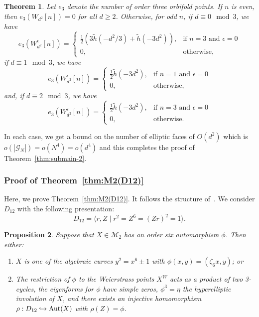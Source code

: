\documentclass[a4paper,11pt]{amsart}
\numberwithin{equation}{section}
\numberwithin{figure}{section}
\numberwithin{table}{section}
\newtheorem{theorem}{Theorem}[section]
\newtheorem{proposition}[theorem]{Proposition}
\DeclareMathOperator{\Aut}{{\rm{Aut}}}
\begin{document}
\begin{theorem}\label{thm:e3}
    Let $e_{3}$ denote the number of order three orbifold points. If $n$ is even, then $e_{3}(W_{d^2}[n]) = 0$ for all $d\geq 2$. Otherwise, for odd $n$, if $d\equiv 0\!\!\mod 3$, we have
    \[e_{3}(W_{d^2}^{\epsilon}[n]) = \left\lbrace\begin{array}{cl}
        \frac{1}{2}(3\tilde{h}(-d^2/3) + \tilde{h}(-3d^2)), & \text{if $n = 3$ and $\epsilon = 0$} \\
        0, & \text{otherwise},
    \end{array}\right.\]
    if $d\equiv 1\!\!\mod 3$, we have
    \[e_{3}(W_{d^2}^{\epsilon}[n]) = \left\lbrace\begin{array}{cl}
        \frac{1}{2}\tilde{h}(-3d^2), & \text{if $n = 1$ and $\epsilon = 0$} \\
        0, & \text{otherwise},
    \end{array}\right.\]
    and, if $d\equiv 2\!\!\mod 3$, we have
    \[e_{3}(W_{d^2}^{\epsilon}[n]) = \left\lbrace\begin{array}{cl}
        \frac{1}{2}\tilde{h}(-3d^2), & \text{if $n = 3$ and $\epsilon = 0$} \\
        0, & \text{otherwise}.
    \end{array}\right.\]
\end{theorem}

In each case, we get a bound on the number of elliptic faces of $O(d^2)$ which is $o(|\mathcal{G}_{N}|) = o(N^{4}) = o(d^{4})$ and this completes the proof of Theorem~\ref{thm:submain-2}.

\subsubsection{Proof of Theorem~\ref{thm:M2(D12)}}

Here, we prove Theorem~\ref{thm:M2(D12)}. It follows the structure of~\cite[\S 2]{Muk}. We consider $D_{12}$ with the following presentation:
\[D_{12} = \langle r, Z\mid r^2 = Z^6 = (Zr)^2 = 1\rangle.\]

\begin{proposition}\label{prop:M2(D12)-1}
    Suppose that $X\in\mathcal{M}_{2}$ has an order six automorphism $\phi$. Then either:
    \begin{enumerate}
        \item $X$ is one of the algebraic curves $y^2 = x^6\pm 1$ with $\phi(x,y) = (\zeta_{6}x,y)$; or
        \item The restriction of $\phi$ to the Weierstrass points $X^{W}$ acts as a product of two 3-cycles, the eigenforms for $\phi$ have simple zeros, $\phi^3 = \eta$ the hyperelliptic involution of $X$, and there exists an injective homomorphism $\rho:D_{12}\hookrightarrow\Aut(X)$ with $\rho(Z) = \phi$.
    \end{enumerate}
\end{proposition}
\end{document}
